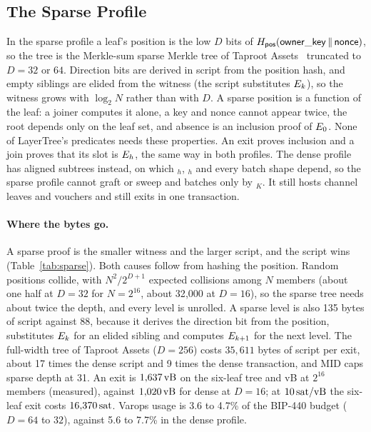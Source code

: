 
\subsection{The Sparse Profile}\label{app:sparse}

In the sparse profile a leaf's position is the low $D$ bits of
$H_{\mathsf{pos}}(\mathsf{owner\_key} \,\|\, \mathsf{nonce})$, so the tree is the
Merkle-sum sparse Merkle tree of Taproot Assets~\cite{mssmt} truncated to
$D = 32$ or $64$. Direction bits are derived in script from the position
hash, and empty siblings are elided from the witness (the script
substitutes $E_k$), so the witness grows with $\log_2 N$ rather than
with $D$. A sparse position is a function of the leaf: a joiner computes it
alone, a key and nonce cannot appear twice, the root depends only on the
leaf set, and absence is an inclusion proof of $E_0$. None of
LayerTree's predicates needs these properties. An exit proves inclusion
and a join proves that its slot is $E_h$, the same way in both profiles.
The dense profile has aligned subtrees instead, on which $_h$,
$_h$ and every batch shape depend, so the sparse
profile cannot graft or sweep and batches only by $_K$. It still
hosts channel leaves and vouchers and still exits in one transaction.

\paragraph{Where the bytes go.} A sparse proof is the smaller witness and
the larger script, and the script wins (Table~\ref{tab:sparse}). Both
causes follow from hashing the position. Random positions collide, with
$N^2/2^{D+1}$ expected collisions among $N$ members (about one half at
$D = 32$ for $N = 2^{16}$, about 32{,}000 at $D = 16$), so the sparse tree
needs about twice the depth, and every level is unrolled. A sparse level
is also 135 bytes of script against 88, because it derives the direction
bit from the position, substitutes $E_k$ for an elided sibling and
computes $E_{k+1}$ for the next level. The full-width tree of Taproot
Assets ($D = 256$) costs $35{,}611$ bytes of script per exit, about 17
times the dense script and 9 times the dense transaction, and MID caps
sparse depth at 31. An exit is $1{,}637\,\mathrm{vB}$ on the six-leaf tree and
\sparseExitBig{} vB at $2^{16}$ members (measured), against $1{,}020\,\mathrm{vB}$
for dense at $D = 16$; at $10\,\mathrm{sat}/\mathrm{vB}$ the six-leaf exit costs
$16{,}370\,\mathrm{sat}$. Varops usage is 3.6 to 4.7\% of the BIP-440 budget
($D = 64$ to $32$), against 5.6 to 7.7\% in the dense profile.

